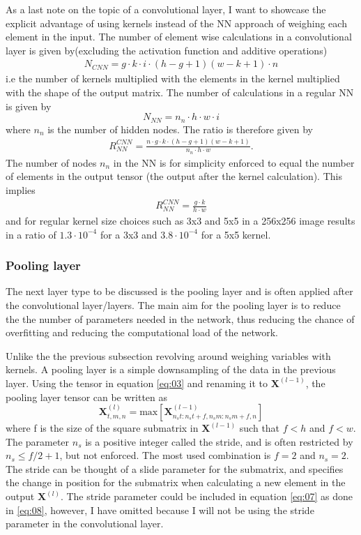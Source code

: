 \documentclass[%
 uio,
 jmp,
 amsmath,amssymb,
 reprint, nofootinbib]{revtex4-1}
\numberwithin{equation}{section}
\newcommand{\lp}{\left(}
\newcommand{\rp}{\right)}
\newcommand{\lsb}{\left[}
\newcommand{\rsb}{\right]}
\begin{document}
As a last note on the topic of a convolutional layer, I want to showcase the explicit advantage of using kernels instead of the NN approach of weighing each element in the input. The number of element wise calculations in a convolutional layer is given by(excluding the activation function and additive operations)
\begin{align}
N_{CNN} = g\cdot k\cdot i\cdot\lp h-g+1\rp\lp w-k+1\rp\cdot n
\end{align}
i.e the number of kernels multiplied with the elements in the kernel multiplied with the shape of the output matrix. The number of calculations in a regular NN is given by
\begin{equation}
N_{NN} = n_n\cdot h\cdot w\cdot i
\end{equation}
where \(n_n\) is the number of hidden nodes. The ratio is therefore given by
\begin{align}
R_{NN}^{CNN} = \frac{n\cdot g\cdot k\cdot\lp h-g+1\rp\lp w-k+1\rp}{n_n\cdot h\cdot w}.
\end{align}
The number of nodes \(n_n\) in the NN is for simplicity enforced to equal the number of elements in the output tensor (the output after the kernel calculation). This implies
\begin{align}
R_{NN}^{CNN} = \frac{g\cdot k}{h\cdot w}
\end{align}
and for regular kernel size choices such as 3x3 and 5x5 in a 256x256 image results in a ratio of \(1.3\cdot 10^{-4}\) for a 3x3 and \(3.8\cdot 10^{-4}\) for a 5x5 kernel.

\subsubsection{Pooling layer}

The next layer type to be discussed is the pooling layer and is often applied after the convolutional layer/layers. The main aim for the pooling layer is to reduce the the number of parameters needed in the network, thus reducing the chance of overfitting and reducing the computational load of the network.

Unlike the the previous subsection revolving around weighing variables with kernels. A pooling layer is a simple downsampling of the data in the previous layer. Using the tensor in equation \ref{eq:03} and renaming it to \(\bm{X}^{(l-1)}\), the pooling layer tensor can be written as
\begin{equation}\label{eq:08}
\bm{X}^{(l)}_{t, m, n} = \text{max}\lsb\bm{X}^{(l-1)}_{n_st:n_st + f, n_sm:n_sm + f, n}\rsb
\end{equation}
where f is the size of the square submatrix in \(\bm{X}^{(l-1)}\) such that \(f<h\) and \(f<w\). The parameter \(n_s\) is a positive integer called the stride, and is often restricted by \(n_s \leq f/2 + 1\), but not enforced. The most used combination is \(f=2\) and \(n_s=2\). The stride can be thought of a slide parameter for the submatrix, and specifies the change in position for the submatrix when calculating a new element in the output \(\bm{X}^{(l)}\). The stride parameter could be included in equation \ref{eq:07} as done in \ref{eq:08}, however, I have omitted because I will not be using the stride parameter in the convolutional layer.
\end{document}
